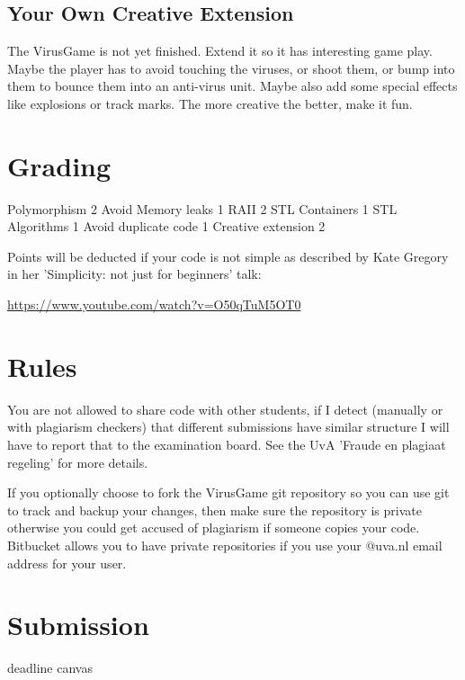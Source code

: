 \documentclass[12pt]{article}
\begin{document}
\subsection{Your Own Creative Extension}
The VirusGame is not yet finished. Extend it so it has interesting game
play. Maybe the player has to avoid touching the viruses, or shoot
them, or bump into them to bounce them into an anti-virus unit. Maybe also
add some special effects like explosions or track marks. The more
creative the better, make it fun.

\section{Grading}

Polymorphism          2
Avoid Memory leaks    1
RAII                  2
STL Containers        1
STL Algorithms        1
Avoid duplicate code  1
Creative extension    2

Points will be deducted if your code is not simple as described by
Kate Gregory in her 'Simplicity: not just for beginners' talk:

\url{https://www.youtube.com/watch?v=O50qTuM5OT0}

\section{Rules}
You are not allowed to share code with other students, if I detect
(manually or with plagiarism checkers) that different submissions have
similar structure I will have to report that to the examination
board. See the UvA 'Fraude en plagiaat regeling' for more details.

If you optionally choose to fork the VirusGame git repository so you
can use git to track and backup your changes, then make sure the
repository is private otherwise you could get accused of plagiarism if
someone copies your code. Bitbucket allows you to have private
repositories if you use your @uva.nl email address for your user.

\section{Submission}
deadline
canvas
\end{document}
